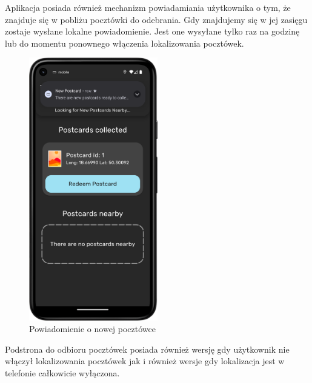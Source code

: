 \documentclass[a4paper,twoside,12pt]{book}
\begin{document}
Aplikacja posiada również mechanizm powiadamiania użytkownika o tym, że znajduje się w pobliżu pocztówki do odebrania. Gdy znajdujemy się w jej zasięgu zostaje wysłane lokalne powiadomienie. Jest one wysyłane tylko raz na godzinę lub do momentu ponownego włączenia lokalizowania pocztówek.

\begin{figure}[H]
    \centering
    \includegraphics[width=0.5\textwidth]{mobile_ss/powiadomienie.png}
    \caption{Powiadomienie o nowej pocztówce}
\end{figure}

Podstrona do odbioru pocztówek posiada również wersję gdy użytkownik nie włączył lokalizowania pocztówek jak i również wersje gdy lokalizacja jest w telefonie całkowicie wyłączona.
\end{document}
